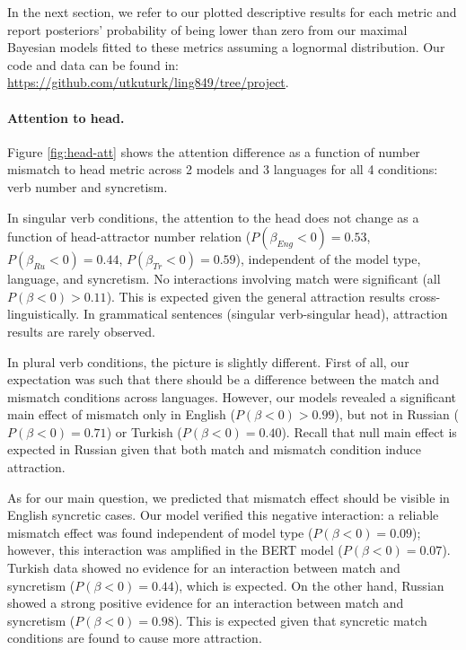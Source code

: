 \documentclass[10pt,letterpaper]{article}
\begin{document}
In the next section, we refer to our plotted descriptive results for each metric and report posteriors' probability of being lower than zero from our maximal Bayesian models fitted to these metrics assuming a lognormal distribution. Our code and data can be found in: \url{https://github.com/utkuturk/ling849/tree/project}.

\paragraph{Attention to head.}

Figure \ref{fig:head-att} shows the attention difference as a function of number mismatch to head metric across 2 models and 3 languages for all 4 conditions: verb number and syncretism. 

In singular verb conditions, the attention to the head does not change as a function of head-attractor number relation ($P(\beta_{Eng} < 0) = 0.53$, $P(\beta_{Ru} < 0) = 0.44$, $P(\beta_{Tr} < 0) = 0.59$), independent of the model type, language, and syncretism. No interactions involving match were significant (all $P(\beta < 0) > 0.11$). This is expected given the general attraction results cross-linguistically. In grammatical sentences (singular verb-singular head), attraction results are rarely observed.  

In plural verb conditions, the picture is slightly different. First of all, our expectation was such that there should be a difference  between the match and mismatch conditions across languages. However, our models revealed a significant main effect of mismatch only in English ($P(\beta < 0) > 0.99$), but not in Russian ($P(\beta < 0) = 0.71$) or Turkish ($P(\beta < 0) = 0.40$). Recall that null main effect is expected in Russian given that both match and mismatch condition induce attraction.

As for our main question, we predicted that mismatch effect should be visible in English syncretic cases. Our model verified this negative interaction: a reliable mismatch effect was found independent of model type ($P(\beta < 0) = 0.09$); however, this interaction was amplified in the BERT model ($P(\beta < 0) = 0.07$). Turkish data showed no evidence for an interaction between match and syncretism ($P(\beta < 0) = 0.44$), which is expected. On the other hand, Russian showed a strong positive evidence for an interaction between match and syncretism ($P(\beta < 0) = 0.98$). This is expected given that syncretic match conditions are found to cause more attraction. 
\end{document}
